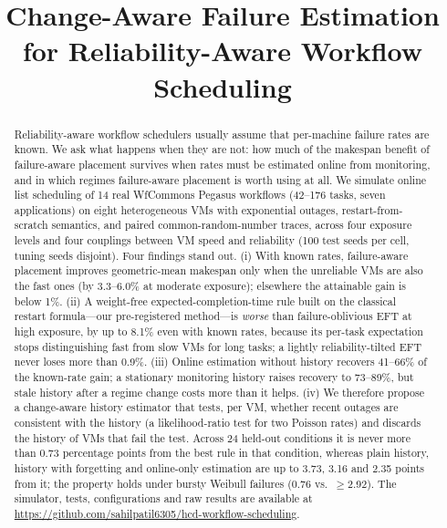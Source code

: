 \documentclass[conference]{IEEEtran}
\begin{document}
\title{Change-Aware Failure Estimation for Reliability-Aware Workflow Scheduling}

\author{
}

\maketitle


\begin{abstract}
Reliability-aware workflow schedulers usually assume that per-machine failure rates are
known. We ask what happens when they are not: how much of the makespan benefit of
failure-aware placement survives when rates must be estimated online from monitoring,
and in which regimes failure-aware placement is worth using at all. We simulate online
list scheduling of 14 real WfCommons Pegasus workflows (42--176 tasks, seven applications)
on eight heterogeneous VMs with exponential outages, restart-from-scratch semantics, and
paired common-random-number traces, across four exposure levels and four couplings
between VM speed and reliability (100 test seeds per cell, tuning seeds disjoint).
Four findings stand out. (i) With known rates, failure-aware placement improves
geometric-mean makespan only when the unreliable VMs are also the fast ones
(by 3.3--6.0\% at moderate exposure); elsewhere the attainable gain is below 1\%.
(ii) A weight-free expected-completion-time rule built on the classical restart formula---our
pre-registered method---is \emph{worse} than failure-oblivious EFT at high exposure, by up to 8.1\% even with
known rates, because its per-task expectation stops distinguishing fast from slow VMs for long
tasks; a lightly reliability-tilted EFT never loses more than 0.9\%. (iii) Online
estimation without history recovers 41--66\% of the known-rate gain; a stationary monitoring
history raises recovery to 73--89\%, but stale history after a regime change costs more
than it helps. (iv) We therefore propose a change-aware history estimator that tests, per VM, whether
recent outages are consistent with the history (a likelihood-ratio test for two Poisson rates) and
discards the history of VMs that fail the test. Across 24 held-out conditions it is never more than
0.73 percentage points from the best rule in that condition, whereas plain history, history with
forgetting and online-only estimation are up to 3.73, 3.16 and 2.35 points from it; the property
holds under bursty Weibull failures (0.76 vs.\ $\geq$2.92). The simulator, tests, configurations and raw
results are available at \url{https://github.com/sahilpatil6305/hcd-workflow-scheduling}.
\end{abstract}
\end{document}
